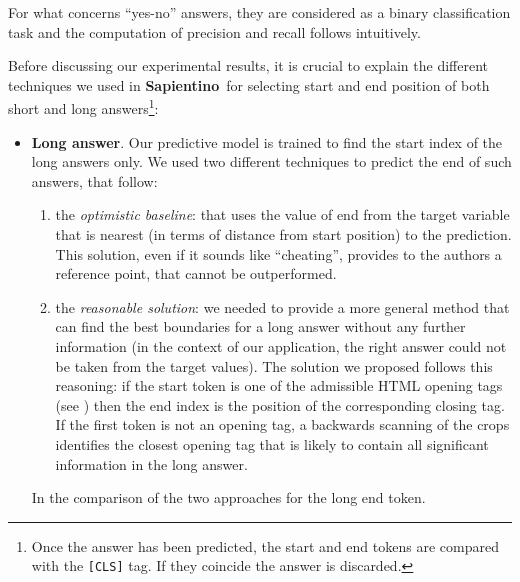 \documentclass[10pt,hidelinks]{article}
\newcommand\nomefico{\textbf{Sapientino}}
\begin{document}
\noindent For what concerns ``yes-no'' answers, they are considered as a binary classification task and the computation of precision and recall follows intuitively.

Before discussing our experimental results, it is crucial to explain the different techniques we used in \nomefico~for selecting start and end position of both short and long answers\footnote{Once the answer has been predicted, the start and end tokens are compared with the \texttt{[CLS]} tag. If they coincide the answer is discarded.}:

\begin{itemize}
    \item \textbf{Long answer}. Our predictive model is trained to find the start index of the long answers only. We used two different techniques to predict the end of such answers, that follow:
    \begin{enumerate}
        \item the \emph{optimistic baseline}: that uses the value of end from the target variable that is nearest (in terms of distance from start position) to the prediction.
        This solution, even if it sounds like ``cheating'', provides to the authors a reference point, that cannot be outperformed.
        \item the \emph{reasonable solution}: we needed to provide a more general method that can find the best boundaries for a long answer without any further information (in the context of our application, the right answer could not be taken from the target values).
        The solution we proposed follows this reasoning: if the start token is one of the admissible HTML opening tags (see ) then the end index is the position of the corresponding closing tag.
        If the first token is not an opening tag, a backwards scanning of the crops identifies the closest opening tag that is likely to contain all significant information in the long answer.
    \end{enumerate}
    In  the comparison of the two approaches for the long end token.
    

\end{itemize}
\end{document}
